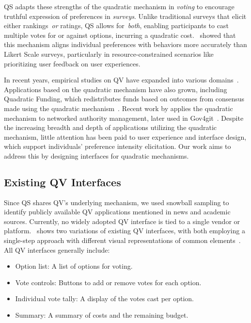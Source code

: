 QS adapts these strengths of the quadratic mechanism in \textit{voting} to encourage truthful expression of preferences in \textit{surveys}. Unlike traditional surveys that elicit either rankings~\textit{or} ratings, QS allows for~\textit{both}, enabling participants to cast multiple votes for or against options, incurring a quadratic cost.~\citet{chengCanShowWhat2021} showed that this mechanism aligns individual preferences with behaviors more accurately than Likert Scale surveys, particularly in resource-constrained scenarios like prioritizing user feedback on user experiences.

In recent years, empirical studies on QV have expanded into various domains~\cite{naylor2017first, cavaille2024cares}. Applications based on the quadratic mechanism have also grown, including Quadratic Funding, which redistributes funds based on outcomes from consensus made using the quadratic mechanism~\cite{buterinFlexibleDesignFunding2019a, freitasQuadraticFundingIncomplete2024}. Recent work by \citet{southPluralManagement2024} applies the quadratic mechanism to networked authority management, later used in Gov4git~\cite{Gov4gitDecentralizedPlatform2023}. Despite the increasing breadth and depth of applications utilizing the quadratic mechanism, little attention has been paid to user experience and interface design, which support individuals' preference intensity elicitation. Our work aims to address this by designing interfaces for quadratic mechanisms.

\subsection{Existing QV Interfaces}
\label{sec:related_qv}

Since QS shares QV's underlying mechanism, we used snowball sampling to identify publicly available QV applications mentioned in news and academic sources. Currently, no widely adopted QV interface is tied to a single vendor or platform.~ shows two variations of existing QV interfaces, with both employing a single-step approach with different visual representations of common elements~\cite{Gov4gitDecentralizedPlatform2023, yehjxraymondYehjxraymondQvapp2024, chengCanShowWhat2021, cavaille2024cares}. All QV interfaces generally include:

\begin{itemize}[leftmargin=*]
    \item Option list: A list of options for voting.
    \item Vote controls: Buttons to add or remove votes for each option.
    \item Individual vote tally: A display of the votes cast per option.
    \item Summary: A summary of costs and the remaining budget.
\end{itemize}

